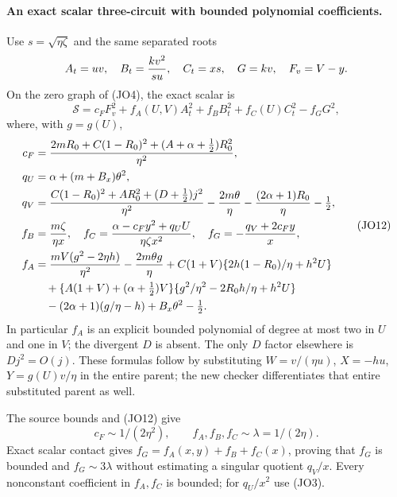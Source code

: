 \paragraph{An exact scalar three-circuit with bounded polynomial coefficients.}
Use $s=\sqrt{\eta\zeta}$ and the same separated roots
\[
 A_t=uv,\quad B_t={kv^2\over su},\quad C_t=xs,\quad
 G=kv,\quad F_v=V-y.
\]
On the zero graph of (JO4), the exact scalar is
\[
 \mathcal S=c_FF_v^2+f_A(U,V)A_t^2+f_BB_t^2+
                       f_C(U)C_t^2-f_GG^2,            \tag{JO11}
\]
where, with $g=g(U)$,
\[
 \begin{aligned}
 c_F&={2mR_0+C(1-R_0)^2+(A+\alpha+\tfrac12)R_0^2\over\eta^2},\\
 q_U&=\alpha+(m+B_x)\theta^2,\\
 q_V&={C(1-R_0)^2+AR_0^2+(D+\tfrac12)j^2\over\eta^2}
       -{2m\theta\over\eta}-{(2\alpha+1)R_0\over\eta}-\tfrac12,\\
 f_B&={m\zeta\over\eta x},\quad
 f_C={\alpha-c_Fy^2+q_UU\over\eta\zeta x^2},\quad
 f_G=-{q_V+2c_Fy\over x},                              \\
 f_A&={mV(g^2-2\eta h)\over\eta^2}-{2m\theta g\over\eta}
       +C(1+V)\{2h(1-R_0)/\eta+h^2U\}\\
 &\quad+\{A(1+V)+(\alpha+\tfrac12)V\}
                   \{g^2/\eta^2-2R_0h/\eta+h^2U\}\\
 &\quad-(2\alpha+1)(g/\eta-h)+B_x\theta^2-\tfrac12 .
 \end{aligned} \tag{JO12}
\]
In particular $f_A$ is an explicit bounded polynomial of degree at
most two in $U$ and one in $V$; the divergent $D$ is absent.
The only $D$ factor elsewhere is $Dj^2=O(j)$. These formulas
follow by substituting $W=v/(\eta u)$, $X=-hu$, $Y=g(U)v/\eta$
in the entire parent; the new checker differentiates that entire
substituted parent as well.

The source bounds and (JO12) give
\[
 c_F\sim1/(2\eta^2),\qquad
 f_A,f_B,f_C\sim\lambda=1/(2\eta).
\]
Exact scalar contact gives
$f_G=f_A(x,y)+f_B+f_C(x)$, proving that $f_G$ is bounded
and $f_G\sim3\lambda$ without estimating a singular quotient
$q_V/x$. Every nonconstant coefficient in $f_A,f_C$ is bounded;
for $q_U/x^2$ use (JO3).

